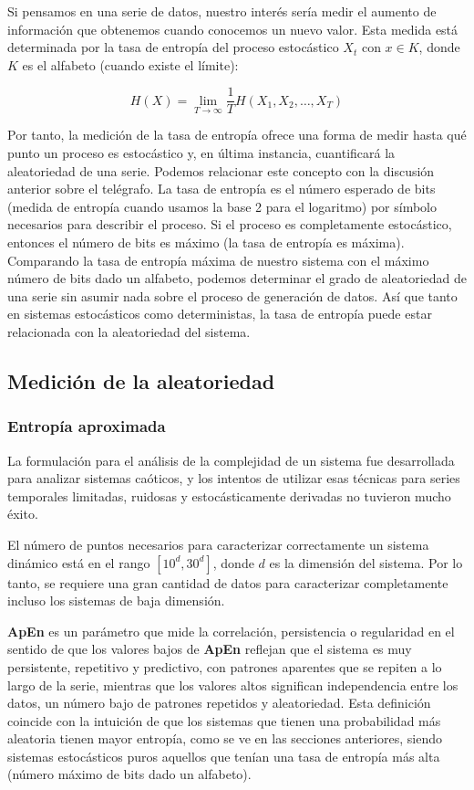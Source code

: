 \documentclass[a4paper,12pt]{article}
\begin{document}
Si pensamos en una serie de datos, nuestro interés sería medir el aumento de información que obtenemos cuando conocemos un nuevo valor. Esta medida está determinada por la tasa de entropía del proceso estocástico $X_t$ con $x \in K$, donde $K$ es el alfabeto (cuando existe el límite):

$$H(X) = \lim_{T\to\infty} \frac{1}{T} H(X_1, X_2, \dots, X_T)$$

Por tanto, la medición de la tasa de entropía ofrece una forma de medir hasta qué punto un proceso es estocástico y, en última instancia, cuantificará la aleatoriedad de una serie. Podemos relacionar este concepto con la discusión anterior sobre el telégrafo. La tasa de entropía es el número esperado de bits (medida de entropía cuando usamos la base 2 para el logaritmo) por símbolo necesarios para describir el proceso. Si el proceso es completamente estocástico, entonces el número de bits es máximo (la tasa de entropía es máxima). Comparando la tasa de entropía máxima de nuestro sistema con el máximo número de bits dado un alfabeto, podemos determinar el grado de aleatoriedad de una serie sin asumir nada sobre el proceso de generación de datos. Así que tanto en sistemas estocásticos como deterministas, la tasa de entropía puede estar relacionada con la aleatoriedad del sistema.

\subsection{Medición de la aleatoriedad}
\subsubsection{Entropía aproximada} 

La formulación para el análisis de la complejidad de un sistema fue desarrollada para analizar sistemas caóticos, y los intentos de utilizar esas técnicas para series temporales limitadas, ruidosas y estocásticamente derivadas no tuvieron mucho éxito. 

El número de puntos necesarios para caracterizar correctamente un sistema dinámico está en el rango $[10^d,  30^d]$, donde $d$ es la dimensión del sistema. Por lo tanto, se requiere una gran cantidad de datos para caracterizar completamente incluso los sistemas de baja dimensión. 

\textbf{ApEn} es un parámetro que mide la correlación, persistencia o regularidad en el sentido de que los valores bajos de \textbf{ApEn} reflejan que el sistema es muy persistente, repetitivo y predictivo, con patrones aparentes que se repiten a lo largo de la serie, mientras que los valores altos significan independencia entre los datos, un número bajo de patrones repetidos y aleatoriedad. Esta definición coincide con la intuición de que los sistemas que tienen una probabilidad más aleatoria tienen mayor entropía, como se ve en las secciones anteriores, siendo sistemas estocásticos puros aquellos que tenían una tasa de entropía más alta (número máximo de bits dado un alfabeto).
\end{document}
